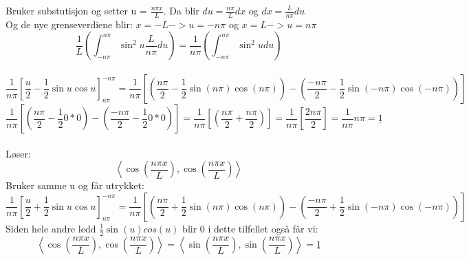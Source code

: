 \documentclass[12pt,norsk,a4paper]{article}
\begin{document}
        Bruker substutisjon og setter u = $\frac{n\pi x}{L}$. Da blir $du = \frac{n\pi}{L}dx$ og $dx = \frac{L}{n\pi}du$\\
        Og de nye grenseverdiene blir: 
        $x=-L -> u = -n\pi$ og $x=L -> u = n\pi$\\
        \[\frac{1}{L}\left(\int_{-n\pi}^{n\pi} \sin^2u \frac{L}{n\pi} du\right) = \frac{1}{n\pi}\left(\int_{-n\pi}^{n\pi} \sin^2u du\right)\]\\
        \[\frac{1}{n\pi}\left[\frac{u}{2}-\frac{1}{2}\sin u \cos u\right]_{n\pi}^{-n\pi} = \frac{1}{n\pi}\left[(\frac{n\pi}{2}-\frac{1}{2}\sin (n\pi) \cos (n\pi)) - (\frac{-n\pi}{2}-\frac{1}{2}\sin (-n\pi) \cos (-n\pi))\right]\]
        \[\frac{1}{n\pi}\left[(\frac{n\pi}{2}-\frac{1}{2}0*0)-(\frac{-n\pi}{2}-\frac{1}{2}0*0)\right] = \frac{1}{n\pi}\left[(\frac{n\pi}{2}+\frac{n\pi}{2})\right] = \frac{1}{n\pi}\left[\frac{2n\pi}{2}\right] = \frac{1}{n\pi}n\pi = \underline{1}\]
        \\Løser:\\
        \[\left\langle \cos(\frac{n\pi x}{L}),\cos(\frac{n\pi x}{L}) \right\rangle\]
        Bruker samme u og får utrykket:\\
        \[\frac{1}{n\pi}\left[\frac{u}{2}+\frac{1}{2}\sin u \cos u\right]_{n\pi}^{-n\pi} = \frac{1}{n\pi}\left[(\frac{n\pi}{2}+\frac{1}{2}\sin (n\pi) \cos (n\pi)) - (\frac{-n\pi}{2}+\frac{1}{2}\sin (-n\pi) \cos (-n\pi))\right]\]
        Siden hele andre ledd $\frac{1}{2}\sin(u)cos(u)$ blir 0 i dette tilfellet også får vi:
        \[\left\langle \cos(\frac{n\pi x}{L}),\cos(\frac{n\pi x}{L}) \right\rangle = \left\langle \sin(\frac{n\pi x}{L}),\sin(\frac{n\pi x}{L}) \right\rangle = \underline{1}\]
\end{document}
